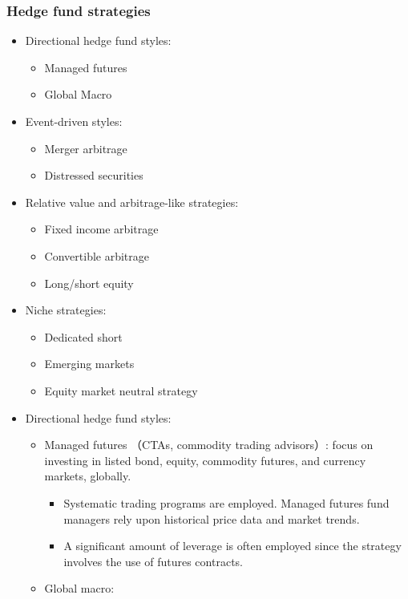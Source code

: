 \subsubsection{Hedge fund strategies}
\begin{itemize}
\item Directional hedge fund styles:
    \begin{itemize}
    \item Managed futures
    \item Global Macro
    \end{itemize}
\item Event-driven styles:
    \begin{itemize}
    \item Merger arbitrage
    \item Distressed securities
    \end{itemize}
\item Relative value and arbitrage-like strategies:
    \begin{itemize}
    \item Fixed income arbitrage
    \item Convertible arbitrage
    \item Long/short equity
    \end{itemize}
\item Niche strategies:
    \begin{itemize}
    \item Dedicated short
    \item Emerging markets
    \item Equity market neutral strategy
    \end{itemize}
\item Directional hedge fund styles:
    \begin{itemize}
    \item Managed futures （CTAs, commodity trading advisors）: focus on investing in listed bond, equity, commodity futures, and currency markets, globally.
        \begin{itemize}
        \item Systematic trading programs are employed. Managed futures fund managers rely upon historical price data and market trends.
        \item A significant amount of leverage is often employed since the strategy involves the use of futures contracts.
        \end{itemize}
    \item  Global macro:
        \begin{itemize}

\end{itemize}
\end{itemize}
\end{itemize}
